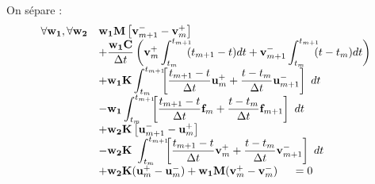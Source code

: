 \documentclass[12pt,a4paper]{report}
\begin{document}
On sépare :
\begin{equation}
\begin{array}{r l}
	\forall \mathbf{w_1},\forall \mathbf{w_2}
	&\displaystyle
	 \mathbf{w_1} \mathbf{M}
		\left[ \mathbf{v}_{m+1}^- - \mathbf{v}_m^+ \right]
	\\ 
	  &\displaystyle
	  +\frac{\mathbf{w_1} \mathbf{C}}{\Delta t}
	     \left(
	  		\mathbf{v}_m^+ \int_{t_m}^{t_{m+1}} \!\!\! 	
			(t_{m+1}-t) dt  + 
			\mathbf{v}_{m+1}^- \int_{t_m}^{t_{m+1}} \!\!\!
			(t-t_m) dt
		 \right)
	\\
	  &\displaystyle
	 +\mathbf{w_1} \mathbf{K}\int_{t_m}^{t_{m+1}} \!\!\! 	
		\left[
			\frac{t_{m+1}-t}{\Delta t} \mathbf{u}_m^+ + 
			\frac{t-t_m}{\Delta t} \mathbf{u}_{m+1}^- 
			\right] ~dt
	\\
	  &\displaystyle
	   -\mathbf{w_1} \int_{t_m}^{t_{m+1}} \!\!\!
		\left[
			\frac{t_{m+1}-t}{\Delta t} \mathbf{f}_m + 
			\frac{t-t_m}{\Delta t} \mathbf{f}_{m+1}
			\right] ~dt
	\\
	  &+\displaystyle
	    \mathbf{w_2} \mathbf{K}
		\left[ \mathbf{u}_{m+1}^- - \mathbf{u}_m^+ \right]
	\\
	  &\displaystyle	    
	    -\mathbf{w_2} \mathbf{K}~\int_{t_m}^{t_{m+1}} \!\!\! 	
		\left[
			\frac{t_{m+1}-t}{\Delta t} \mathbf{v}_m^+ + 
			\frac{t-t_m}{\Delta t} \mathbf{v}_{m+1}^- 
			\right] ~dt
	\\
	  &+ \mathbf{w_2} \mathbf{K} (\mathbf{u}_m^+ - \mathbf{u}_m^-)
	   +  \mathbf{w_1} \mathbf{M}(\mathbf{v}_m^+ - \mathbf{v}_m^-)
	~~~~=0
\end{array}
\end{equation}
\end{document}
